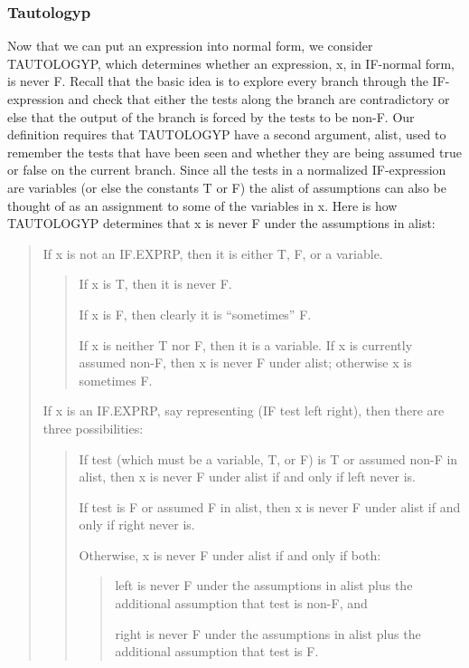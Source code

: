 \documentclass[11pt]{book}
\newenvironment{pubcrown}{\begin{quote}}{\end{quote}}
\newcommand{\pubdefaulttextsize}{\large}
\begin{document}
\subsubsection{Tautologyp}
\pubdefaulttextsize
Now that we can put an expression into normal form, we
consider TAUTOLOGYP, which
determines whether an expression, x, in IF-normal form, is never F.
Recall that the basic idea is to explore
every branch through the IF-expression and check that either
the tests along the branch are contradictory or else that the output
of the branch is forced by the tests to be non-F.  Our definition
requires that TAUTOLOGYP have a second argument, alist,
used to remember the tests that have been seen and whether
they are being assumed true or false on the current branch. 
Since all the tests in a normalized IF-expression are variables (or else
the constants T or F) the alist of assumptions can also be thought of as an assignment to some
of the variables in x.
Here is how TAUTOLOGYP determines that x is never F under the assumptions in alist:
\begin{pubcrown}
If x is not an IF.EXPRP, then it is either T, F, or a variable.
\begin{pubcrown}
If x is T, then it is never F.

If x is F, then clearly it is ``sometimes'' F.

If x is neither T nor F, then it is a variable. If x is currently
assumed non-F, then x is never F under  alist;
otherwise x is sometimes F.
\end{pubcrown}

If x is an IF.EXPRP, say representing (IF test left right), then there
are three possibilities:
\begin{pubcrown}
If test (which must be a variable, T, or F) is T or assumed non-F in
alist, then x is never F under alist if and
only if left never is.

If test is F or assumed F in alist, then x is never F under
alist if and only if right never is.

Otherwise, x is never F under alist if and only
if both:
\begin{pubcrown}
left is never F under the assumptions in alist plus the additional
assumption that test is non-F, and

right is never F under the assumptions in alist plus the additional
assumption that test is F.
\end{pubcrown}
\end{pubcrown}
\end{pubcrown}
\end{document}
